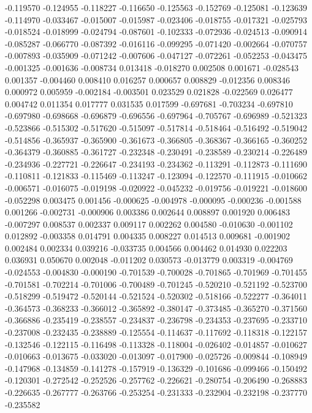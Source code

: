 -0.119570
-0.124955
-0.118227
-0.116650
-0.125563
-0.152769
-0.125081
-0.123639
-0.114970
-0.033467
-0.015007
-0.015987
-0.023406
-0.018755
-0.017321
-0.025793
-0.018524
-0.018999
-0.024794
-0.087601
-0.102333
-0.072936
-0.024513
-0.090914
-0.085287
-0.066770
-0.087392
-0.016116
-0.099295
-0.071420
-0.002664
-0.070757
-0.007893
-0.035909
-0.071242
-0.007606
-0.047127
-0.072261
-0.052253
-0.043475
-0.001325
-0.001636
-0.008734
0.013418
-0.018270
0.002508
0.001671
-0.028543
0.001357
-0.004460
0.008410
0.016257
0.000657
0.008829
-0.012356
0.008346
0.000972
0.005959
-0.002184
-0.003501
0.023529
0.021828
-0.022569
0.026477
0.004742
0.011354
0.017777
0.031535
0.017599
-0.697681
-0.703234
-0.697810
-0.697980
-0.698668
-0.696879
-0.696556
-0.697964
-0.705767
-0.696989
-0.521323
-0.523866
-0.515302
-0.517620
-0.515097
-0.517814
-0.518464
-0.516492
-0.519042
-0.514856
-0.365937
-0.365900
-0.361673
-0.366805
-0.368367
-0.366165
-0.360252
-0.364379
-0.360885
-0.361727
-0.232348
-0.230491
-0.238589
-0.230214
-0.226489
-0.234936
-0.227721
-0.226647
-0.234193
-0.234362
-0.113291
-0.112873
-0.111690
-0.110811
-0.121833
-0.115469
-0.113247
-0.123094
-0.122570
-0.111915
-0.010662
-0.006571
-0.016075
-0.019198
-0.020922
-0.045232
-0.019756
-0.019221
-0.018600
-0.052298
0.003475
0.001456
-0.000625
-0.004978
-0.000095
-0.000236
-0.001588
0.001266
-0.002731
-0.000906
0.003386
0.002644
0.008897
0.001920
0.006483
-0.007297
0.008537
0.002337
0.009117
0.002262
0.004580
-0.010630
-0.001102
0.012892
-0.003358
0.014791
0.004335
0.008227
0.014513
0.009681
-0.001902
0.002484
0.002334
0.039216
-0.033735
0.004566
0.004462
0.014930
0.022203
0.036931
0.050670
0.002048
-0.011202
0.030573
-0.013779
0.003319
-0.004769
-0.024553
-0.004830
-0.000190
-0.701539
-0.700028
-0.701865
-0.701969
-0.701455
-0.701581
-0.702214
-0.701006
-0.700489
-0.701245
-0.520210
-0.521192
-0.523700
-0.518299
-0.519472
-0.520144
-0.521524
-0.520302
-0.518166
-0.522277
-0.364011
-0.364573
-0.368233
-0.366012
-0.365892
-0.380147
-0.373485
-0.365270
-0.371560
-0.366886
-0.235419
-0.238557
-0.234837
-0.236798
-0.234353
-0.237695
-0.233710
-0.237008
-0.232435
-0.238889
-0.125554
-0.114637
-0.117692
-0.118318
-0.122157
-0.132546
-0.122115
-0.116498
-0.113328
-0.118004
-0.026402
-0.014857
-0.010627
-0.010663
-0.013675
-0.033020
-0.013097
-0.017900
-0.025726
-0.009844
-0.108949
-0.147968
-0.134859
-0.141278
-0.157919
-0.136329
-0.101686
-0.099466
-0.150492
-0.120301
-0.272542
-0.252526
-0.257762
-0.226621
-0.280754
-0.206490
-0.268883
-0.226635
-0.267777
-0.263766
-0.253254
-0.231333
-0.232904
-0.232198
-0.237770
-0.235582
